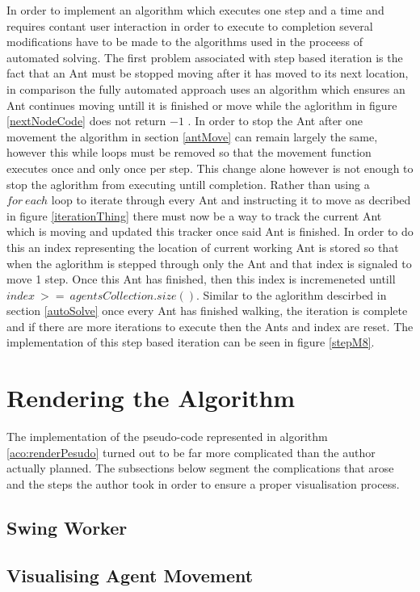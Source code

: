 In order to implement an algorithm which executes one step and a time and requires contant user interaction in order to execute to completion several modifications have to be made to the algorithms used in the proceess of automated solving. The first problem associated with step based iteration is the fact that an Ant must be stopped moving after it has moved to its next location, in comparison the fully automated approach uses an algorithm which ensures an Ant continues moving untill it is finished or move while the aglorithm in figure \ref{nextNodeCode} does not return $-1$ . In order to stop the Ant after one movement the algorithm in section \ref{antMove} can remain largely the same, however this while loops must be removed so that the movement function executes once and only once per step. This change alone however is not enough to stop the aglorithm from executing untill completion. Rather than using a $for\ each$ loop to iterate through every Ant and instructing it to move as decribed in figure \ref{iterationThing} there must now be a way to track the current Ant which is moving and updated this tracker once said Ant is finished. In order to do this an index representing the location of current working Ant is stored so that when the aglorithm is stepped through only the Ant and that index is signaled to move 1 step. Once this Ant has finished, then this index is incremeneted untill $index\ >=\ agentsCollection.size()$. Similar to the aglorithm descirbed in section \ref{autoSolve} once every Ant has finished walking, the iteration is complete and if there are more iterations to execute then the Ants and index are reset. The implementation of this step based iteration can be seen in figure \ref{stepM8}.

\section{Rendering the Algorithm}

The implementation of the pseudo-code represented in algorithm \ref{aco:renderPesudo} turned out to be far more complicated than the author actually planned. The subsections below segment the complications that arose and the steps the author took in order to ensure a proper visualisation process.

\subsection{Swing Worker}

\subsection{Visualising Agent Movement}

